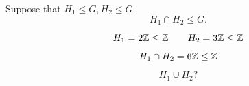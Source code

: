 \begin{frame}
  \begin{theorem}
    Suppose that $H_{1} \le G, H_{2} \le G$.
    \[
      H_{1} \cap H_{2} \le G.
    \]
  \end{theorem}

  \pause
  \[
    H_{1} = 2\mathbb{Z} \le \mathbb{Z} \qquad H_{2} = 3\mathbb{Z} \le \mathbb{Z}
  \]

  \pause
  \[
    H_{1} \cap H_{2} = 6\mathbb{Z} \le \mathbb{Z}
  \]

  \pause
  \[
    H_{1} \cup H_{2} ?
  \]
\end{frame}

